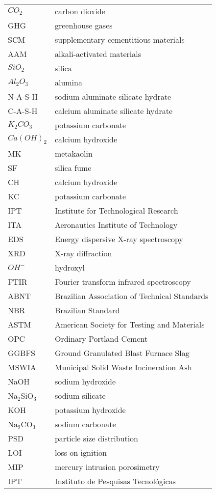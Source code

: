 \begin{longtable}{ll}
$CO_2$ & carbon dioxide \\
GHG & greenhouse gases \\
SCM & supplementary cementitious materials \\
AAM & alkali-activated materials \\
$ SiO_2$ & silica \\
$ Al_2O_3$ & alumina \\
N-A-S-H & sodium aluminate silicate hydrate \\
C-A-S-H & calcium aluminate silicate hydrate  \\
$K_2CO_3$ & potassium carbonate \\
$Ca(OH)_2$ & calcium hydroxide \\
MK & metakaolin \\
SF & silica fume \\
CH & calcium hydroxide \\
KC & potassium carbonate \\
IPT & Institute for Technological Research \\
ITA & Aeronautics Institute of Technology \\
EDS & Energy dispersive X-ray spectroscopy \\
XRD & X-ray diffraction \\
$OH^-$ & hydroxyl \\
FTIR & Fourier transform infrared spectroscopy \\
ABNT & Brazilian Association of Technical Standards \\
NBR & Brazilian Standard \\
ASTM & American Society for Testing and Materials \\
OPC & Ordinary Portland Cement \\
GGBFS & Ground Granulated Blast Furnace Slag \\
MSWIA & Municipal Solid Waste Incineration Ash \\
NaOH & sodium hydroxide \\
Na$_2$SiO$_3$ & sodium silicate \\
KOH & potassium hydroxide \\
Na$_2$CO$_3$ & sodium carbonate \\
PSD & particle size distribution \\
LOI & loss on ignition \\
MIP & mercury intrusion porosimetry \\
IPT & Instituto de Pesquisas Tecnológicas \\
\end{longtable}